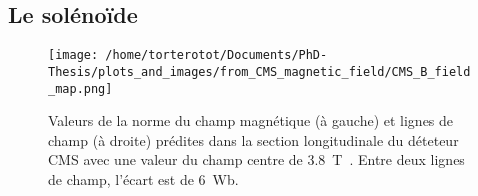 \subsection{Le solénoïde}\label{chapter-LHC-section-CMS-subsec-solenoide}

\begin{figure}[h]
\centering
\texttt{[image: /home/torterotot/Documents/PhD-Thesis/plots\_and\_images/from\_CMS\_magnetic\_field/CMS\_B\_field\_map.png]}
\caption[Champ magnétique dans le détecteur CMS.]{Valeurs de la norme du champ magnétique (à gauche) et lignes de champ (à droite) prédites dans la section longitudinale du déteteur CMS avec une valeur du champ centre de \SI{3.8}{\tesla}~\cite{CMS_magnetic_field}. Entre deux lignes de champ, l'écart est de \SI{6}{\weber}.}
\label{fig-chapter-LHC-section-CMS-subsec-solenoide-CMS_B_field_map}
\end{figure}